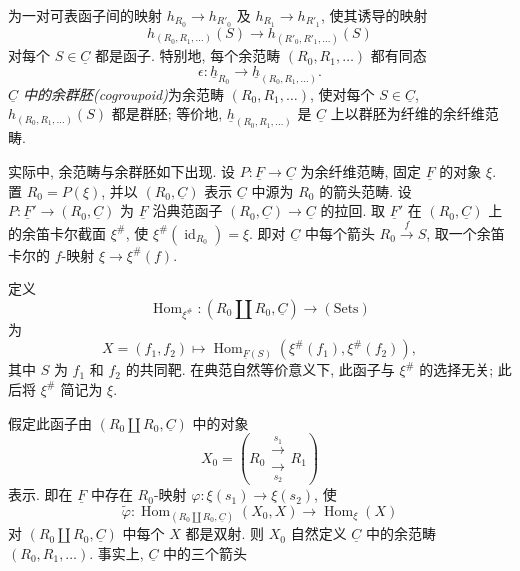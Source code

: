 
为一对可表函子间的映射 $h_{R_0}\longrightarrow h_{R'_0}$ 及
$h_{R_1}\longrightarrow h_{R'_1}$,
使其诱导的映射
\[
 h_{(R_0,R_1,\ldots)}(S)
 \longrightarrow h_{(R'_0,R'_1,\ldots)}(S)
\]
对每个 $S\in\underline C$ 都是函子.
特别地, 每个余范畴 $(R_0,R_1,\ldots)$ 都有同态
\[
 \epsilon:\underline h_{R_0}
 \longrightarrow\underline h_{(R_0,R_1,\ldots)}.
\]
\emph{$\underline C$ 中的余群胚(cogroupoid)}为余范畴 $(R_0,R_1,\ldots)$,
使对每个 $S\in\underline C$, $h_{(R_0,R_1,\ldots)}(S)$ 都是群胚;
等价地, $\underline h_{(R_0,R_1,\ldots)}$ 是 $\underline C$
上以群胚为纤维的余纤维范畴.

实际中, 余范畴与余群胚如下出现.
设 $P:\underline F\longrightarrow\underline C$ 为余纤维范畴,
固定 $\underline F$ 的对象 $\xi$.
置 $R_0=P(\xi)$, 并以 $(R_0,\underline C)$ 表示
$\underline C$ 中源为 $R_0$ 的箭头范畴.
设 $P:\underline F'\longrightarrow(R_0,\underline C)$ 为
$\underline F$ 沿典范函子 $(R_0,\underline C)\longrightarrow\underline C$ 的拉回.
取 $\underline F'$ 在 $(R_0,\underline C)$ 上的余笛卡尔截面 $\xi^{\#}$,
使 $\xi^{\#}(\operatorname{id}_{R_0})=\xi$.
即对 $\underline C$ 中每个箭头 $R_0\xrightarrow fS$,
取一个余笛卡尔的 $f$-映射 $\xi\longrightarrow\xi^{\#}(f)$.

定义
\[
 \operatorname{Hom}_{\xi^{\#}}:
 (R_0\amalg R_0,\underline C)\longrightarrow(\mathrm{Sets})
\]
为
\[
 X=(f_1,f_2)\longmapsto
 \operatorname{Hom}_{\underline F(S)}
   (\xi^{\#}(f_1),\xi^{\#}(f_2)),
\]
其中 $S$ 为 $f_1$ 和 $f_2$ 的共同靶.
在典范自然等价意义下, 此函子与 $\xi^{\#}$ 的选择无关;
此后将 $\xi^{\#}$ 简记为 $\xi$.

假定此函子由 $(R_0\amalg R_0,\underline C)$ 中的对象
\[
 X_0=
 \left(R_0\mathrel{\substack{\xrightarrow{\ s_1\ }\\[-.6ex]
                              \xrightarrow[\ s_2\ ]{}}}R_1\right)
\]
表示. 即在 $\underline F$ 中存在 $R_0$-映射
$\varphi:\xi(s_1)\longrightarrow\xi(s_2)$, 使
\[
 \widetilde\varphi:
 \operatorname{Hom}_{(R_0\amalg R_0,\underline C)}(X_0,X)
 \longrightarrow\operatorname{Hom}_\xi(X)
\]
对 $(R_0\amalg R_0,\underline C)$ 中每个 $X$ 都是双射.
则 $X_0$ 自然定义 $\underline C$ 中的余范畴 $(R_0,R_1,\ldots)$.
事实上, $\underline C$ 中的三个箭头


